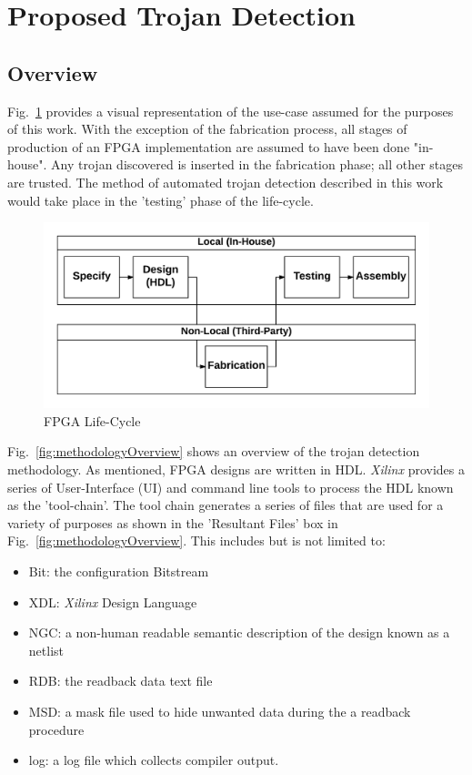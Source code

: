 \documentclass[journal, hidelinks]{IEEEtran}
\begin{document}
\section{Proposed Trojan Detection} \label{sec:methodolgy}

\subsection{Overview}
Fig.~\ref{fig:Concept} provides a visual representation of the use-case assumed for the purposes of this work. 
With the exception of the fabrication process, all stages of production of an FPGA implementation are assumed to have been done "in-house". 
Any trojan discovered is inserted in the fabrication phase; all other stages are trusted.  
The method of automated trojan detection described in this work would take place in the 'testing' phase of the life-cycle. 
\begin{figure}[h]
	\centering
	\includegraphics[width=1\linewidth]{Figures/Concept}
	\caption[FPGA Life-Cycle]{FPGA Life-Cycle}
	\label{fig:Concept}
\end{figure}
Fig.~\ref{fig:methodologyOverview} shows an overview of the trojan detection methodology.
As mentioned, FPGA designs are written in HDL.
\textit{Xilinx} provides a series of User-Interface (UI) and command line tools to process the HDL known as the 'tool-chain'.
The tool chain generates a series of files that are used for a variety of purposes as shown in the 'Resultant Files' box in Fig.~\ref{fig:methodologyOverview}.
This includes but is not limited to:
\begin{itemize}
	\item Bit: the configuration Bitstream
	\item XDL: \textit{Xilinx} Design Language
	\item NGC: a non-human readable semantic description of the design known as a netlist
	\item RDB: the readback data text file
	\item MSD: a mask file used to hide unwanted data during the a readback procedure
	\item log: a log file which collects compiler output.
\end{itemize}
\end{document}

